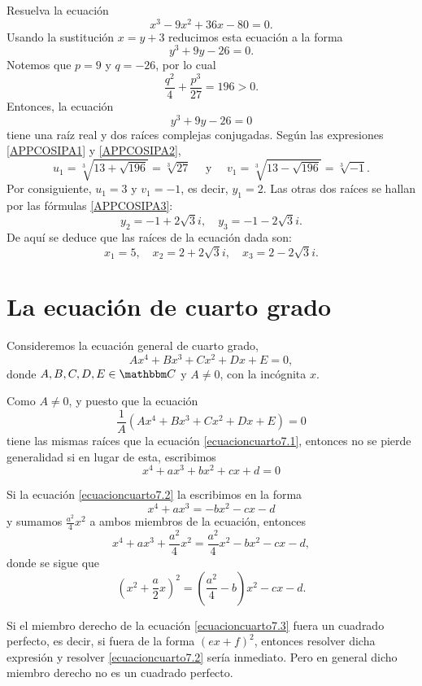 \begin{example}
    Resuelva la ecuación
    $$x^3 - 9x^2 + 36x - 80 = 0.$$
    \solucion Usando la sustitución $x = y + 3$ reducimos esta ecuación a la forma
    $$y^3 + 9y - 26 = 0.$$
    Notemos que $p=9$ y $q=-26$, por lo cual
    $$\frac{q^2}{4}+\frac{p^3}{27}=196>0.$$
    Entonces, la ecuación
    $$y^3 + 9y - 26 = 0$$
    tiene una raíz real y dos raíces complejas conjugadas. Según las expresiones \eqref{APPCOSIPA1} y \eqref{APPCOSIPA2},
    $$u_1=\sqrt[3]{13 + \sqrt{196}}=\sqrt[3]{27} \quad \text{ y } \quad v_1=\sqrt[3]{13 - \sqrt{196}}=\sqrt[3]{-1}.$$
    Por consiguiente, $u_1=3$ y $v_1=-1$, es decir, $y_1=2$. Las otras dos raíces se hallan por las fórmulas \eqref{APPCOSIPA3}:
    $$y_2=-1+2\sqrt{3}i, \quad y_3=-1-2\sqrt{3}i.$$
    De aquí se deduce que las raíces de la ecuación dada son:
    $$x_1=5, \quad x_2=2+2\sqrt{3}i, \quad x_3=2-2\sqrt{3}i.$$
\end{example}

\section{La ecuación de cuarto grado}

Consideremos la ecuación general de cuarto grado,
\begin{equation}
    Ax^4+Bx^3+Cx^2+Dx+E=0, \label{ecuacioncuarto7.1}
\end{equation}
donde $A,  B,  C,  D,  E \in \CC$ y $A \neq 0$, con la incógnita $x$.

Como $A \neq 0$, y puesto que la ecuación
$$\frac{1}{A} \left( Ax^4+Bx^3+Cx^2+Dx+E \right) =0$$
tiene las mismas raíces que la ecuación \eqref{ecuacioncuarto7.1}, entonces no se pierde generalidad si en lugar de esta, escribimos
\begin{equation}
    x^4+ax^3+bx^2+cx+d=0 \label{ecuacioncuarto7.2}
\end{equation}

Si la ecuación \eqref{ecuacioncuarto7.2} la escribimos en la forma
$$x^4+ax^3=-bx^2-cx-d$$
y sumamos $\displaystyle \frac{a^2}{4}x^2$ a ambos miembros de la ecuación, entonces
$$x^4+ax^3+\frac{a^2}{4}x^2=\frac{a^2}{4}x^2-bx^2-cx-d,$$
donde se sigue que
\begin{equation}
    \left( x^2+\frac{a}{2}x \right)^2 = \left( \frac{a^2}{4}-b \right) x^2-cx-d. \label{ecuacioncuarto7.3}
\end{equation}

Si el miembro derecho de la ecuación \eqref{ecuacioncuarto7.3} fuera un cuadrado perfecto, es decir, si fuera de la forma $(ex+f)^2$, entonces resolver dicha expresión y resolver \eqref{ecuacioncuarto7.2} sería inmediato. Pero en general dicho miembro derecho no es un cuadrado perfecto.

